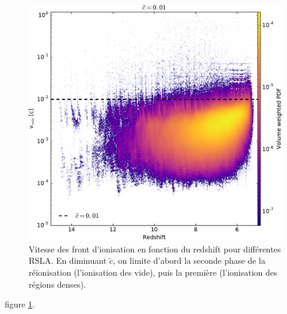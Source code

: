 \begin{figure}
		\includegraphics[height=.3\textheight]{img/04_mapreio/speedreio_z_c001.pdf} 
        \caption[Évolution de la vitesse des fronts]{Vitesse des front d'ionisation en fonction du redshift pour différentes RSLA.
        En diminuant $\tilde{c}$, on limite d'abord la seconde phase de la réionisation (l'ionisation des vide), puis la première (l'ionisation des régions denses).
        }        
 		\label{fig:vreioz}
\end{figure}



figure \ref{fig:vreioz}.

